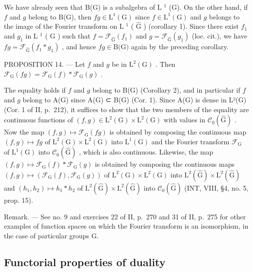 We have already seen that B(G) is a subalgebra of L \(^{1}\) (G). On the other hand, if \(f\) and \(g\) belong to B(G), then \(fg \in \text{L}^{1}(\text{G})\) since \(f \in \text{L}^{1}(\text{G})\) and \(g\) belongs to the image of the Fourier transform on L \(^{1}\) ( \(\widehat{\text{G}}\) ) (corollary 1). Since there exist \(f_{1}\) and \(g_{1}\) in L \(^{1}\) ( \(\widehat{\text{G}}\) ) such that \(f = \mathcal{F}_{\widehat{\text{G}}} (f_{1})\) and \(g = \mathcal{F}_{\widehat{\text{G}}} (g_{1})\) (loc. cit.), we have \(fg = \mathcal{F}_{\widehat{\text{G}}} (f_{1} * g_{1})\) , and hence \(fg \in \text{B(G)}\) again by the preceding corollary.

PROPOSITION 14. — Let \(f\) and \(g\) be in \(\mathrm{L}^2 (\mathrm{G})\) . Then \(\mathcal{F}_{\mathrm{G}}(fg) = \mathcal{F}_{\mathrm{G}}(f)*\mathcal{F}_{\mathrm{G}}(g)\) .

The equality holds if \(f\) and \(g\) belong to B(G) (Corollary 2), and in particular if \(f\) and \(g\) belong to A(G) since A(G) ⊂ B(G) (Cor. 1). Since A(G) is dense in L²(G) (Cor. 1 of II, p.~212), it suffices to show that the two members of the equality are continuous functions of \((f,g)\in\mathrm{L}^{2}(\mathrm{G})\times\mathrm{L}^{2}(\mathrm{G})\) with values in \(\mathcal{C}_{0}(\widehat{\mathrm{G}})\) . Now the map \((f,g)\mapsto\mathcal{F}_{\mathrm{G}}(fg)\) is obtained by composing the continuous map \((f,g)\mapsto fg\) of \(\mathrm{L}^{2}(\mathrm{G})\times\mathrm{L}^{2}(\mathrm{G})\) into \(\mathrm{L}^{1}(\mathrm{G})\) and the Fourier transform \(\mathcal{F}_{\mathrm{G}}\) of \(\mathrm{L}^{1}(\mathrm{G})\) into \(\mathcal{C}_{0}(\widehat{\mathrm{G}})\) , which is also continuous. Likewise, the map \((f,g)\mapsto\mathcal{F}_{\mathrm{G}}(f)*\mathcal{F}_{\mathrm{G}}(g)\) is obtained by composing the continuous maps \((f,g)\mapsto(\mathcal{F}_{\mathrm{G}}(f),\mathcal{F}_{\mathrm{G}}(g))\) of \(\mathrm{L}^{2}(\mathrm{G})\times\mathrm{L}^{2}(\mathrm{G})\) into \(\mathrm{L}^{2}(\widehat{\mathrm{G}})\times\mathrm{L}^{2}(\widehat{\mathrm{G}})\) and \((h_{1},h_{2})\mapsto h_{1}*h_{2}\) of \(\mathrm{L}^{2}(\widehat{\mathrm{G}})\times\mathrm{L}^{2}(\widehat{\mathrm{G}})\) into \(\mathcal{C}_{0}(\widehat{\mathrm{G}})\) (INT, VIII, §4, no. 5, prop. 15).

Remark. --- See no. 9 and exercises 22 of II, p.~270 and 31 of II, p.~275 for other examples of function spaces on which the Fourier transform is an isomorphism, in the case of particular groups G.

\subsection{Functorial properties of duality}

